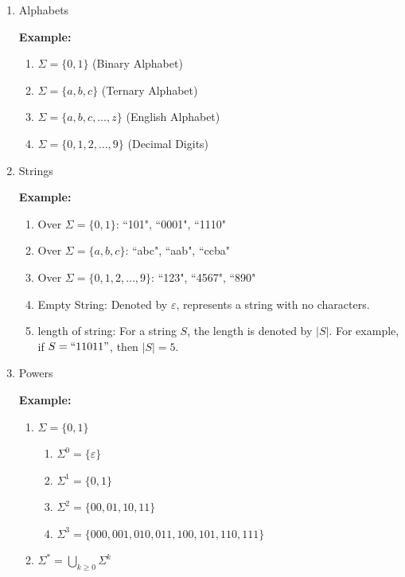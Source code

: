 \documentclass[12pt,a4paper,openany]{article}
\begin{document}
\begin{enumerate}
    \item Alphabets
    
    \textbf{Example:}

    \begin{enumerate}
        \item $\Sigma = \{0, 1\}$ (Binary Alphabet)
        \item $\Sigma = \{a, b, c\}$ (Ternary Alphabet)
        \item $\Sigma = \{a, b, c, \ldots, z\}$ (English Alphabet)
        \item $\Sigma = \{0, 1, 2, \ldots, 9\}$ (Decimal Digits)
    \end{enumerate}
    
    
    \item Strings
    
    \textbf{Example:}
    \begin{enumerate}
        \item Over $\Sigma = \{0, 1\}$: ``101", ``0001", ``1110"
        \item Over $\Sigma = \{a, b, c\}$: ``abc", ``aab", ``ccba"
        \item Over $\Sigma = \{0, 1, 2, \ldots, 9\}$: ``123", ``4567", ``890"
        \item Empty String: Denoted by $\varepsilon$, represents a string with no characters.
        \item length of string: For a string $S$, the length is denoted by $|S|$. For example, if $S = ``11011"$, then $|S| = 5$.
    \end{enumerate}
    
    \item Powers
    
    \textbf{Example:}
    \begin{enumerate}
        \item $\Sigma = \{0, 1\}$
        \begin{enumerate}
            \item $\Sigma^0 = \{\varepsilon\}$
            \item $\Sigma^1 = \{0, 1\}$
            \item $\Sigma^2 = \{00, 01, 10, 11\}$
            \item $\Sigma^3 = \{000, 001, 010, 011, 100, 101, 110, 111\}$
        \end{enumerate}
        
        \item $\Sigma^* = \displaystyle\bigcup_{k\ge0} \Sigma^k $
    \end{enumerate}


\end{enumerate}
\end{document}
